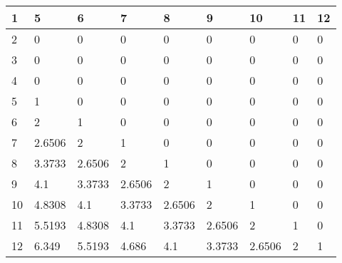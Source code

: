 \begin{tabular}{|l|l|l|l|l|l|l|l|l|}
\hline
1&5&6&7&8&9&10&11&12\\\hline
2&0&0&0&0&0&0&0&0\\\hline
3&0&0&0&0&0&0&0&0\\\hline
4&0&0&0&0&0&0&0&0\\\hline
5&1&0&0&0&0&0&0&0\\\hline
6&2&1&0&0&0&0&0&0\\\hline
7&2.6506&2&1&0&0&0&0&0\\\hline
8&3.3733&2.6506&2&1&0&0&0&0\\\hline
9&4.1&3.3733&2.6506&2&1&0&0&0\\\hline
10&4.8308&4.1&3.3733&2.6506&2&1&0&0\\\hline
11&5.5193&4.8308&4.1&3.3733&2.6506&2&1&0\\\hline
12&6.349&5.5193&4.686&4.1&3.3733&2.6506&2&1\\\hline
\end{tabular}
